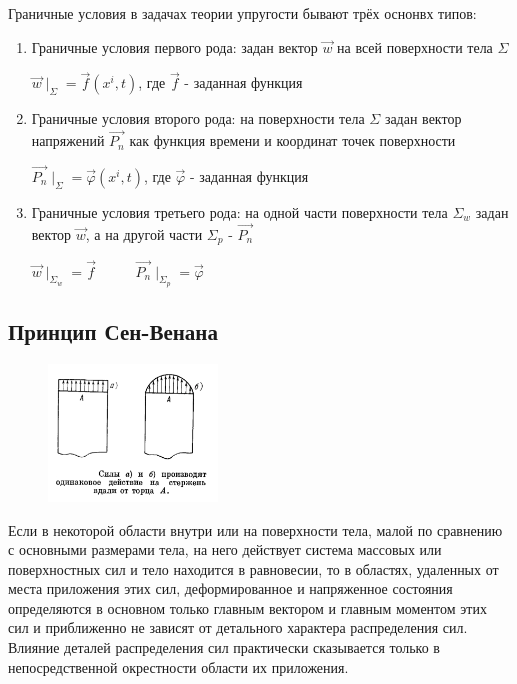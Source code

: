 Граничные условия в задачах теории упругости бывают трёх оснонвх типов:
\begin{enumerate}
\item Граничные условия первого рода: задан вектор $\vec{w}$ на всей поверхности тела $\Sigma$
\begin{center}
$\vec{w}\mid_{\Sigma} = \vec{f}(x^i,t)$, где $\vec{f}$ - заданная функция
\end{center}

\item Граничные условия второго рода: на поверхности тела $\Sigma$ задан вектор напряжений $\vec{P_n}$ как функция времени и координат точек поверхности
\begin{center}
$\vec{P_n}\mid_{\Sigma} = \vec{\varphi}(x^i,t)$, где $\vec{\varphi}$ - заданная функция
\end{center}

\item Граничные условия третьего рода: на одной части поверхности тела  $\Sigma_w$ задан вектор $\vec{w}$, а на другой части  $\Sigma_p$ - $\vec{P_n}$
\begin{center}
$\vec{w}\mid_{\Sigma_w} = \vec{f}$ \ \ \ \ \  $\vec{P_n}\mid_{\Sigma_p} = \vec{\varphi}$
\end{center}
\end{enumerate}

\subsection{Принцип Сен-Венана}

\begin{figure}
\includegraphics[width=0.4\textwidth]{19/sen_venan.png}
\end{figure}

Если в некоторой области внутри или на поверхности тела, малой по сравнению с основными размерами тела, на него действует система массовых или поверхностных сил и тело находится в равновесии, то в областях, удаленных от места приложения этих сил, деформированное и напряженное состояния определяются в основном только главным вектором и главным моментом этих сил и приближенно не зависят от детального характера распределения сил. Влияние деталей распределения сил практически сказывается только в непосредственной окрестности области их приложения.
